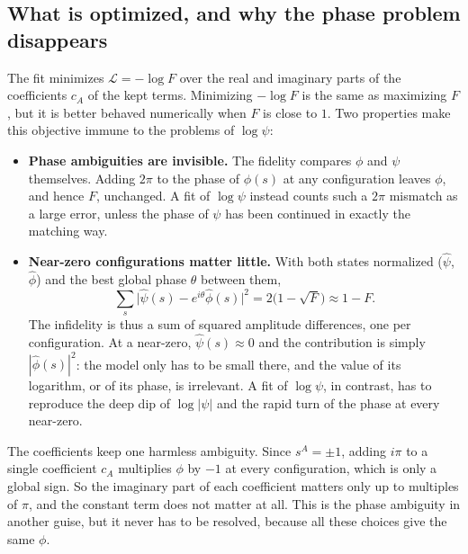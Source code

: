 \documentclass[11pt,a4paper]{article}
\begin{document}
\subsection{What is optimized, and why the phase problem disappears}
The fit minimizes $\mathcal{L}=-\log F$ over the real and imaginary parts of the coefficients $c_A$ of the kept terms. Minimizing $-\log F$ is the same as maximizing $F$, but it is better behaved numerically when $F$ is close to $1$. Two properties make this objective immune to the problems of $\log\psi$:
\begin{itemize}
  \item \textbf{Phase ambiguities are invisible.} The fidelity compares $\phi$ and $\psi$ themselves. Adding $2\pi$ to the phase of $\phi(s)$ at any configuration leaves $\phi$, and hence $F$, unchanged. A fit of $\log\psi$ instead counts such a $2\pi$ mismatch as a large error, unless the phase of $\psi$ has been continued in exactly the matching way.
  \item \textbf{Near-zero configurations matter little.} With both states normalized ($\hat\psi$, $\hat\phi$) and the best global phase $\theta$ between them,
  \[
    \sum_s\bigl|\hat\psi(s)-e^{i\theta}\hat\phi(s)\bigr|^2=2\bigl(1-\sqrt F\bigr)\approx1-F .
  \]
  The infidelity is thus a sum of squared amplitude differences, one per configuration. At a near-zero, $\hat\psi(s)\approx0$ and the contribution is simply $|\hat\phi(s)|^2$: the model only has to be small there, and the value of its logarithm, or of its phase, is irrelevant. A fit of $\log\psi$, in contrast, has to reproduce the deep dip of $\log|\psi|$ and the rapid turn of the phase at every near-zero.
\end{itemize}
The coefficients keep one harmless ambiguity. Since $s^A=\pm1$, adding $i\pi$ to a single coefficient $c_A$ multiplies $\phi$ by $-1$ at every configuration, which is only a global sign. So the imaginary part of each coefficient matters only up to multiples of $\pi$, and the constant term does not matter at all. This is the phase ambiguity in another guise, but it never has to be resolved, because all these choices give the same $\phi$.
\end{document}
